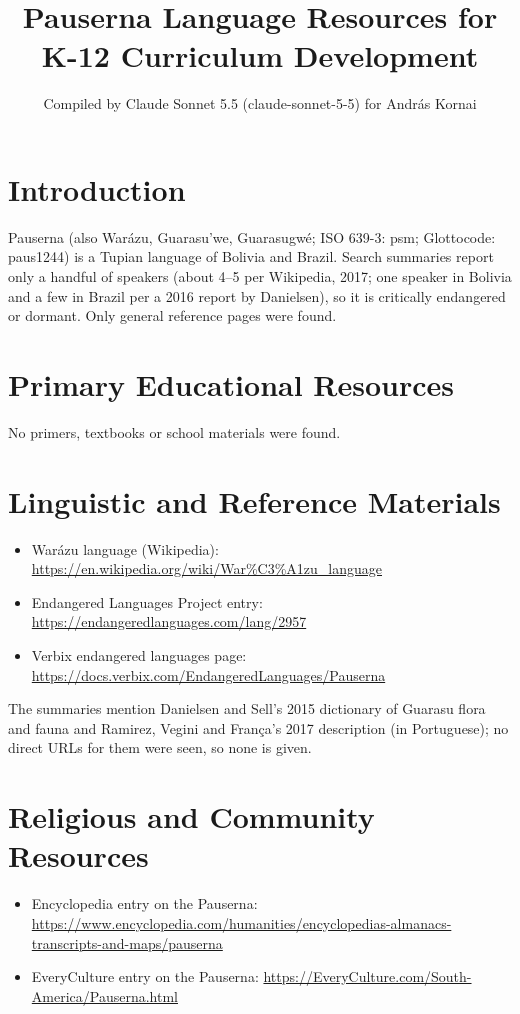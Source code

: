 \documentclass[12pt]{article}
\title{Pauserna Language Resources for K-12 Curriculum Development}
\author{Compiled by Claude Sonnet 5.5 (claude-sonnet-5-5) for Andr\'as Kornai}
\date{}
\begin{document}
\maketitle

\section{Introduction}
Pauserna (also Warázu, Guarasu'we, Guarasugwé; ISO 639-3: psm; Glottocode: paus1244) is a Tupian language of Bolivia and Brazil. Search summaries report only a handful of speakers (about 4--5 per Wikipedia, 2017; one speaker in Bolivia and a few in Brazil per a 2016 report by Danielsen), so it is critically endangered or dormant. Only general reference pages were found.

\section{Primary Educational Resources}
No primers, textbooks or school materials were found.

\section{Linguistic and Reference Materials}
\begin{itemize}
\item Warázu language (Wikipedia): \url{https://en.wikipedia.org/wiki/War%C3%A1zu_language}
\item Endangered Languages Project entry: \url{https://endangeredlanguages.com/lang/2957}
\item Verbix endangered languages page: \url{https://docs.verbix.com/EndangeredLanguages/Pauserna}
\end{itemize}
The summaries mention Danielsen and Sell's 2015 dictionary of Guarasu flora and fauna and Ramirez, Vegini and Fran\c{c}a's 2017 description (in Portuguese); no direct URLs for them were seen, so none is given.

\section{Religious and Community Resources}
\begin{itemize}
\item Encyclopedia entry on the Pauserna: \url{https://www.encyclopedia.com/humanities/encyclopedias-almanacs-transcripts-and-maps/pauserna}
\item EveryCulture entry on the Pauserna: \url{https://EveryCulture.com/South-America/Pauserna.html}
\end{itemize}
\end{document}
